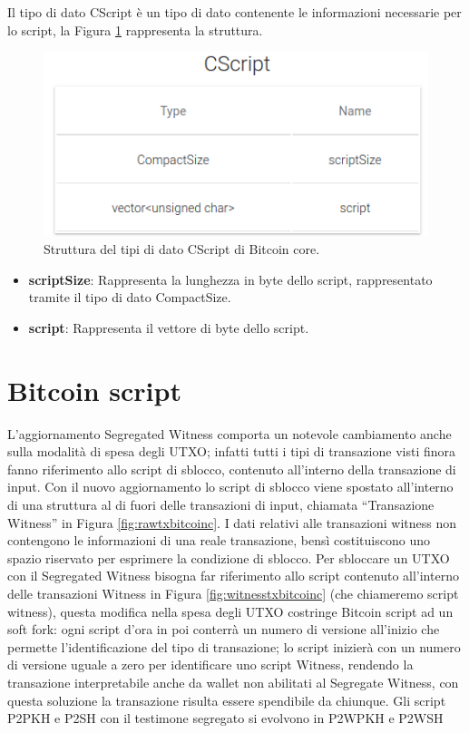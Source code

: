 Il tipo di dato CScript è un tipo di dato contenente le informazioni necessarie per lo script, la Figura \ref{fig:scriptbitcoinc} rappresenta la struttura.
\begin{figure}[H]
\begin{center}
\includegraphics[width=0.6\columnwidth]{images/bitcoinstructs/cscript.png}
\end{center}
\caption{Struttura del tipi di dato CScript di Bitcoin core.}
\label{fig:scriptbitcoinc}
\end{figure}

\begin{itemize}
  \item {\bf scriptSize\/}: Rappresenta la lunghezza in byte dello script, rappresentato tramite il tipo di dato CompactSize.
  \item {\bf script\/}: Rappresenta il vettore di byte dello script.
\end{itemize}

\section{Bitcoin script}
\label{sec:bitcoinscriptbitcoinc}

L’aggiornamento Segregated Witness comporta un notevole cambiamento anche sulla modalità di spesa degli UTXO; infatti tutti i tipi di transazione visti finora fanno riferimento allo script di sblocco, contenuto all’interno della transazione di input.
Con il nuovo aggiornamento lo script di sblocco viene spostato all’interno di una struttura al di fuori delle transazioni di input, chiamata “Transazione Witness” in Figura \ref{fig:rawtxbitcoinc}.
I dati relativi alle transazioni witness non contengono le informazioni di una reale transazione, bensì costituiscono uno spazio riservato per esprimere la condizione di sblocco.
Per sbloccare un UTXO con il Segregated Witness bisogna far riferimento allo script contenuto all’interno delle transazioni Witness in Figura \ref{fig:witnesstxbitcoinc} (che chiameremo script witness), questa modifica nella spesa degli UTXO costringe Bitcoin script ad un soft fork: ogni script d’ora in poi conterrà un numero di versione all’inizio che permette l’identificazione del tipo di transazione; lo script inizierà con un numero di versione uguale a zero per identificare uno script Witness, rendendo la transazione interpretabile anche da wallet non abilitati al Segregate Witness, con questa soluzione la transazione risulta essere spendibile da chiunque.
Gli script P2PKH e P2SH con il testimone segregato si evolvono in P2WPKH e P2WSH

